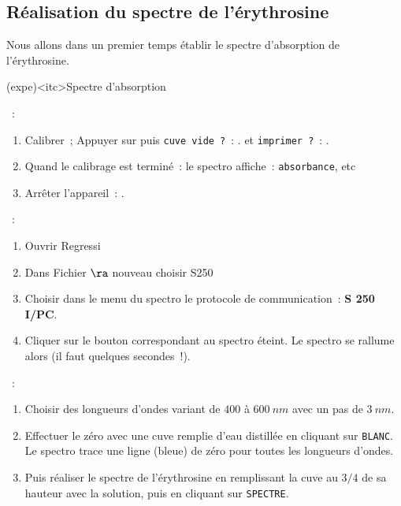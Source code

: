 \documentclass[../main/main.tex]{subfiles}
\begin{document}

\subsection{Réalisation du spectre de l'érythrosine}

Nous allons dans un premier temps établir le spectre d'absorption de l'érythrosine.

\begin{tcb}[breakable](expe)<itc>{Spectre d'absorption}
	\begin{itemize}
		~:
		\begin{enumerate}
			\item Calibrer~; Appuyer sur  puis \texttt{cuve vide~?}~:
			      . et \texttt{imprimer~?}~: .
			\item Quand le calibrage est terminé~: le spectro affiche~:
			      \texttt{absorbance}, etc
			\item Arrêter l'appareil~: .
		\end{enumerate}
		~:
		\begin{enumerate}
			\item Ouvrir Regressi
			\item Dans Fichier $\ra$ nouveau choisir S250
			\item Choisir dans le menu du spectro le protocole de communication~:
			      \textbf{S 250 I/PC}.
			\item Cliquer sur le bouton correspondant au spectro éteint. Le spectro se
			      rallume alors (il faut quelques secondes~!).
		\end{enumerate}
		~:
		\begin{enumerate}
			\item Choisir des longueurs d'ondes variant de $400$ à $\SI{600}{nm}$ avec
			      un pas de $\SI{3}{nm}$.
			\item Effectuer le zéro avec une cuve remplie d'eau distillée en cliquant
			      sur \texttt{BLANC}. Le spectro trace une ligne (bleue) de zéro pour
			      toutes les longueurs d'ondes.
			\item Puis réaliser le spectre de l'érythrosine en remplissant
			      la cuve au $3/4$ de sa hauteur avec la solution, puis en
			      cliquant sur \texttt{SPECTRE}.
		\end{enumerate}
	\end{itemize}
\end{tcb}
\end{document}
